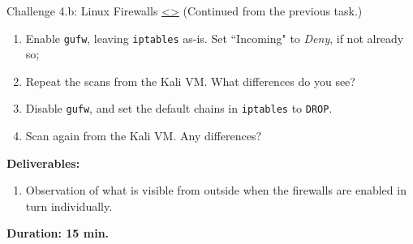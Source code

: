 \documentclass[12pt]{extarticle}
\newenvironment{instructionblock}{\Large\bgroup}{\egroup}
\newcommand{\ben}{\begin{enumerate}}
\newcommand{\een}{\end{enumerate}}
\begin{document}
\pagebreak
\begin{slide}{ Challenge 4.b: Linux Firewalls }{ \hyperref[slide 21]{\textless}\hyperref[slide 23]{\textgreater} }
\vskip 5pt
\begin{instructionblock}
	(Continued from the previous task.)
	\begin{enumerate}
	\item[3] { Enable \texttt{gufw}, leaving \texttt{iptables} as-is. Set ``Incoming" to \textit{Deny}, if not already so; }
	\item[4] { Repeat the scans from the Kali VM. What differences do you see? }
	\item[5] { Disable \texttt{gufw}, and set the default chains in \texttt{iptables} to \texttt{DROP}. }
	\item[6] { Scan again from the Kali VM. Any differences? }
	\end{enumerate}

\end{instructionblock}

\textbf{\Large{Deliverables:}}
\ben
\item Observation of what is visible from outside when the firewalls are enabled in turn individually.
\een

\vspace{20mm}
\begin{center}
	\textbf{\Large{Duration: 15 min.} }
\end{center}

\end{slide}


%
%


\end{document}
